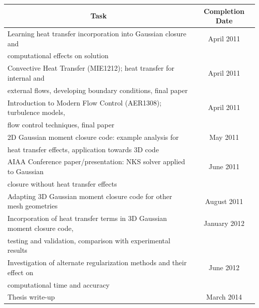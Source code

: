 \documentclass[titlepage,11pt,letterpaper]{article}
\begin{document}
\begin{tabular}{|l|c|} \hline
\multicolumn{1}{|c|}{\bf{Task}} & \multicolumn{1}{|c|}{\bf{Completion Date}} \\

\hline Learning heat transfer incorporation into Gaussian closure and & April 2011 \\ 
computational effects on solution &\\

\hline Convective Heat Transfer (MIE1212); heat transfer for internal and 
& April 2011 \\ external flows, developing boundary conditions, final paper &\\

\hline Introduction to Modern Flow Control (AER1308); turbulence models, &
April 2011 \\ flow control techniques, final paper &\\

\hline 2D Gaussian moment closure code: example analysis for &
May 2011 \\ heat transfer effects, application towards 3D code &\\

\hline AIAA Conference paper/presentation: NKS solver applied to Gaussian  & June 2011 \\ 
closure without heat transfer effects &\\

\hline Adapting 3D Gaussian moment closure code for other mesh geometries & August 2011 \\

\hline Incorporation of heat transfer terms in 3D Gaussian moment closure code, &
January 2012 \\ testing and validation, comparison with experimental results &\\

\hline Investigation of alternate regularization methods and their effect on &
June 2012 \\ computational time and accuracy &\\

\hline Thesis write-up &
March 2014 \\ \hline

\end{tabular}

 
\end{document}
